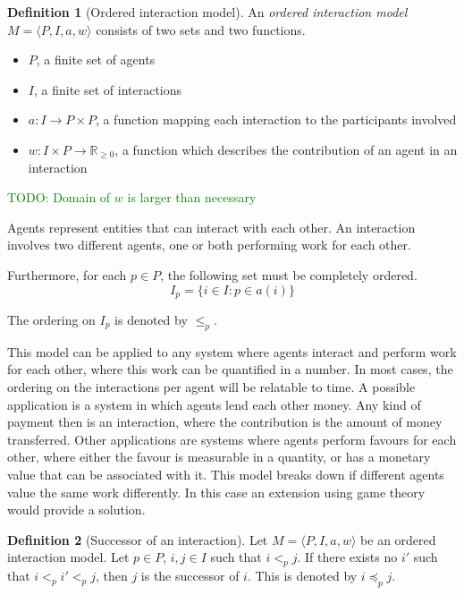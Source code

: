 \documentclass[a4paper,11pt]{book}
\newcommand{\bb}{\mathbb}
\newcommand\suggestion[1]{\textcolor{green}{TODO: #1}}
\theoremstyle{definition}
\newtheorem{definition}{Definition}
\begin{document}
\begin{definition}[Ordered interaction model]
    An \emph{ordered interaction model} $M=\langle P, I, a, w \rangle$ consists of two sets and two functions.
    
    \begin{itemize}
        \item $P$, a finite set of agents
        \item $I$, a finite set of interactions
        \item $a: I \to P \times P$, a function mapping each interaction to the participants involved
        \item $w: I \times P \to \bb{R}_{\geq0}$, a function which describes the contribution of an agent in an interaction
    \end{itemize}

    \suggestion{Domain of $w$ is larger than necessary}

    Agents represent entities that can interact with each other.
    An interaction involves two different agents, one or both performing
    work for each other. 
   
    Furthermore, for each $p \in P$, the following set must be completely ordered.
    \begin{equation*}
        I_p = \{i \in I : p \in a(i)\}
    \end{equation*}

    The ordering on $I_p$ is denoted by $\leq_p$.
\end{definition}

This model can be applied to any system where
agents interact and perform work for each other, where this work can be quantified in a number.
In most cases, the ordering on the interactions per agent will be relatable
to time. A possible application is a system in which agents lend each other money. Any
kind of payment then is an interaction, where the contribution is the amount of money transferred.
Other applications are systems where agents perform favours for each other, where either the favour
is measurable in a quantity, or has a monetary value that can be associated with it.
This model breaks down if different agents value the same work differently. In this case
an extension using game theory would provide a solution.

\begin{definition}[Successor of an interaction]
    Let $M=\langle P, I, a, w \rangle$ be an ordered interaction model.
    Let $p \in P$, $i, j \in I$ such that $i <_p j$. If there exists no $i'$ such that $i <_p i' <_p j$, then
    $j$ is the successor of $i$. This is denoted by $i \preceq_p j$.
\end{definition}
 
\end{document}
